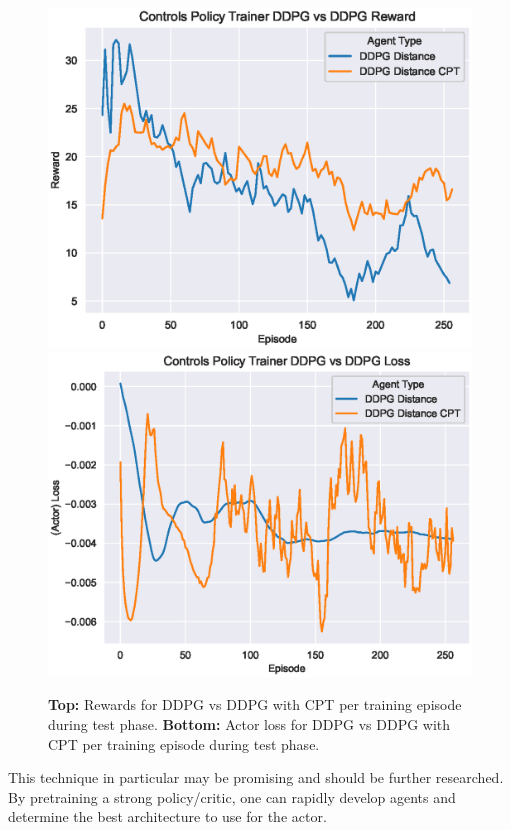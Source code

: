 \begin{figure}[!ht]
    \centering
    \includegraphics[scale=0.5]
    {./figures/cpt/rewards-by-agent-cpt}
    \includegraphics[scale=0.5]
    {./figures/cpt/loss-by-agent-cpt}
    \caption{
        \textbf{Top:} Rewards for DDPG vs DDPG with CPT per training episode during
        test phase.
        \textbf{Bottom:} Actor loss for DDPG vs DDPG with CPT per training episode
        during test phase.
    }
    \label{fig:cpt-graphs}
\end{figure}

This technique in particular may be promising and should be further researched.
By pretraining a strong policy/critic, one can rapidly develop agents and determine
the best architecture to use for the actor.
